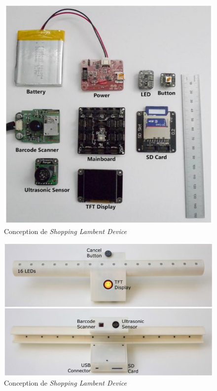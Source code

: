 \documentclass[10pt,a5paper,twoside]{article}
\begin{document}
\begin{figure}
\centering
\includegraphics[]{images/shoppinglambent-screenshot2.png}
\caption{Conception de \emph{Shopping Lambent
Device}}\label{fig:shoppinglambent2}
\end{figure}

\begin{figure}
\centering
\includegraphics[]{images/shoppinglambent-screenshot3.png}
\caption{Conception de \emph{Shopping Lambent
Device}}\label{fig:shoppinglambent5}
\end{figure}
\end{document}
